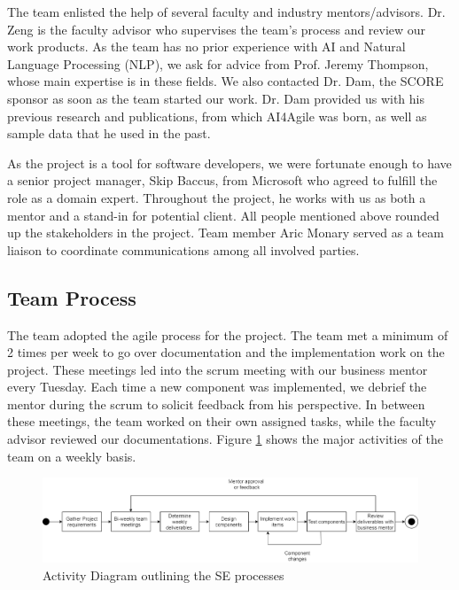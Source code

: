 The team enlisted the help of several faculty and industry mentors/advisors. Dr. Zeng is the faculty advisor who supervises the team's process and review our work products. As the team has no prior experience with AI and Natural Language Processing (NLP), we ask for advice from Prof. Jeremy Thompson, whose main expertise is in these fields. We also contacted Dr. Dam, the SCORE sponsor as soon as the team started our work. Dr. Dam provided us with his previous research and publications, from which AI4Agile was born, as well as sample data that he used in the past. 

As the project is a tool for software developers, we were fortunate enough to have a senior project manager, Skip Baccus, from Microsoft who agreed to fulfill the role as a domain expert. Throughout the project, he works with us as both a mentor and a stand-in for potential client. All people mentioned above rounded up the stakeholders in the project. Team member Aric Monary served as a team liaison to coordinate communications among all involved parties.

\subsection{Team Process}
The team adopted the agile process for the project. The team met a minimum of 2 times per week to go over documentation and the implementation work on the project. These meetings led into the scrum meeting with our business mentor every Tuesday. Each time a new component was implemented, we debrief the mentor during the scrum to solicit feedback from his perspective. In between these meetings, the team worked on their own assigned tasks, while the faculty advisor reviewed our documentations. Figure \ref{fig:acd} shows the major activities of the team on a weekly basis. 

\begin{figure}
\centering
\includegraphics[width=\textwidth,keepaspectratio]{./figure/ActivityDiagram.png}
\caption{Activity Diagram outlining the SE processes}
\label{fig:acd}
\end{figure}

